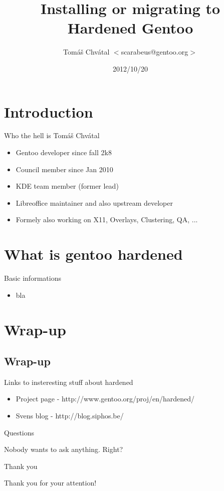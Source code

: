 \documentclass{beamer}
\title{Installing or migrating to Hardened Gentoo}
\author[Tomáš Chvátal]{Tomáš Chvátal $<$scarabeus@gentoo.org$>$}
\date{2012/10/20}
\begin{document}
\frame{\titlepage}
\section{Introduction}
\begin{frame}{Who the hell is Tomáš Chvátal}
	\begin{itemize}
		\item Gentoo developer since fall 2k8
		\item Council member since Jan 2010
		\item KDE team member (former lead)
		\item Libreoffice maintainer and also upstream developer
		\item Formely also working on X11, Overlays, Clustering, QA, ...
	\end{itemize}
\end{frame}
\section{What is gentoo hardened}

\begin{frame}{Basic informations}
	\begin{itemize}
		\item bla
	\end{itemize}
\end{frame}

\section{Wrap-up}

\subsection{Wrap-up}

\begin{frame}{Links to insteresting stuff about hardened}
	\begin{itemize}
		\item Project page - http://www.gentoo.org/proj/en/hardened/
		\item Svens blog - http://blog.siphos.be/
	\end{itemize}
\end{frame}

\begin{frame}{Questions}
	\begin{center}Nobody wants to ask anything. Right?\end{center}
\end{frame}

\begin{frame}{Thank you}
	\begin{center}Thank you for your attention!\end{center}
\end{frame}
\end{document}
